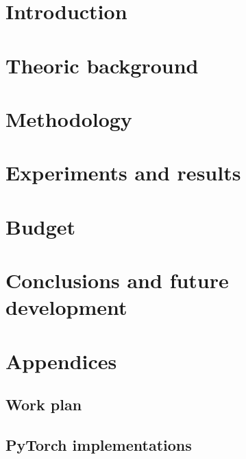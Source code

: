 \documentclass[a4paper,12pt,titlepage]{article}
\begin{document}
\listoffigures
\thispagestyle{empty}

\listoftables
\thispagestyle{empty}

\printglossary[type=\acronymtype,title=Acronyms]
\thispagestyle{empty}

\newpage
{}

\section{Introduction}\label{sec:introduction}


\section{Theoric background}\label{sec:theoric-background}



\section{Methodology}\label{sec:methodology}


\section{Experiments and results}\label{sec:experiments-and-results}


\section{Budget}\label{sec:budget}


\section{Conclusions and future development}\label{sec:conclusions-and-future-development}


\printbibliography

\appendix
\section*{Appendices}
\renewcommand{\thesubsection}{\Alph{subsection}}
\subsection{Work plan}

\subsection{PyTorch implementations}

\end{document}
